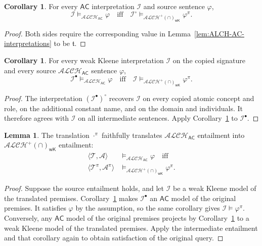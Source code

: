 \documentclass[letterpaper]{article} %
\theoremstyle{definition}
\newtheorem{lemma}{Lemma}
\theoremstyle{definition}
\theoremstyle{definition}
\theoremstyle{definition}
\theoremstyle{definition}
\newcommand{\vt}{\mathfrak{t}}
\newtheorem{corollary}[theorem]{Corollary}
\begin{document}
\begin{corollary}\label{cor:AC-to-wK}
For every $\mathsf{AC}$ interpretation $\mathcal{I}$ and source sentence $\varphi$,
\[
\mathcal{I}\models_{\mathcal{ALCH}_{\mathsf{AC}}}\varphi
\quad\text{iff}\quad
\mathcal{I}^{\circ}\models_{\mathcal{ALCH}^{+}(\cap)_{\mathsf{wK}}}\varphi^{\pi}.
\]
\end{corollary}
\begin{proof}
Both sides require the corresponding value in Lemma~\ref{lem:ALCH-AC-interpretations} to be $\vt$.
\end{proof}

\begin{corollary}\label{cor:wk-to-AC}
For every weak Kleene interpretation $\mathcal{I}$ on the copied signature and every source $\mathcal{ALCH}_{\mathsf{AC}}$ sentence $\varphi$,
\[
\mathcal{I}^{\bullet}\models_{\mathcal{ALCH}_{\mathsf{AC}}}\varphi
\quad\text{iff}\quad
\mathcal{I}\models_{\mathcal{ALCH}^{+}(\cap)_{\mathsf{wK}}}\varphi^{\pi}.
\]
\end{corollary}
\begin{proof}
The interpretation $(\mathcal{I}^{\bullet})^{\circ}$ recovers $\mathcal{I}$ on every copied atomic concept and role, on the additional constant name, and on the domain and individuals. It therefore agrees with $\mathcal{I}$ on all intermediate sentences. Apply Corollary~\ref{cor:AC-to-wK} to $\mathcal{I}^{\bullet}$.
\end{proof}

\begin{lemma}\label{lem:alch-ac-to-alh-wk}
The translation $\cdot^{\pi}$ faithfully translates $\mathcal{ALCH}_{\mathsf{AC}}$ entailment into $\mathcal{ALCH}^{+}(\cap)_{\mathsf{wK}}$ entailment:
\begin{align*}
\langle\mathcal{T},\mathcal{A}\rangle
 &\models_{\mathcal{ALCH}_{\mathsf{AC}}}\varphi
\quad\text{iff}\\
\langle\mathcal{T}^{\pi},\mathcal{A}^{\pi}\rangle
 &\models_{\mathcal{ALCH}^{+}(\cap)_{\mathsf{wK}}}\varphi^{\pi}.
\end{align*}
\end{lemma}
\begin{proof}
Suppose the source entailment holds, and let $\mathcal{I}$ be a weak Kleene model of the translated premises. Corollary~\ref{cor:wk-to-AC} makes $\mathcal{I}^{\bullet}$ an $\mathsf{AC}$ model of the original premises. It satisfies $\varphi$ by the assumption, so the same corollary gives $\mathcal{I}\models\varphi^{\pi}$. Conversely, any $\mathsf{AC}$ model of the original premises projects by Corollary~\ref{cor:AC-to-wK} to a weak Kleene model of the translated premises. Apply the intermediate entailment and that corollary again to obtain satisfaction of the original query.
\end{proof}
\end{document}
